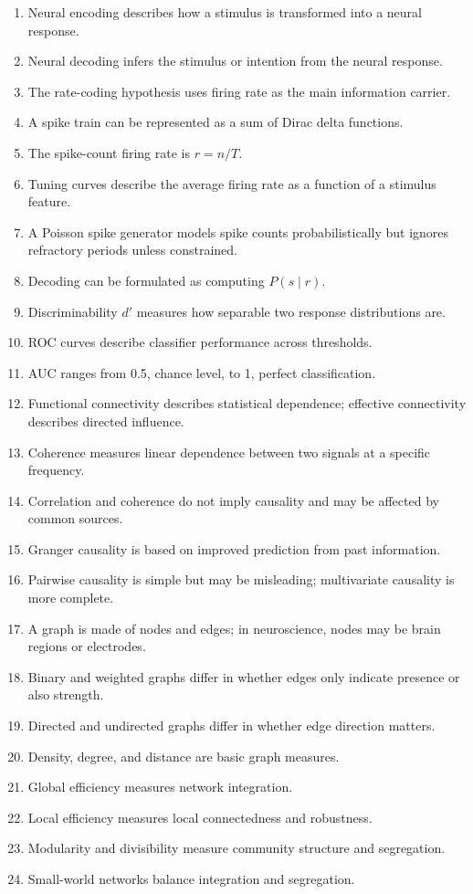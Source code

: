 \begin{enumerate}
    \item Neural encoding describes how a stimulus is transformed into a neural response.
    \item Neural decoding infers the stimulus or intention from the neural response.
    \item The rate-coding hypothesis uses firing rate as the main information carrier.
    \item A spike train can be represented as a sum of Dirac delta functions.
    \item The spike-count firing rate is $r=n/T$.
    \item Tuning curves describe the average firing rate as a function of a stimulus feature.
    \item A Poisson spike generator models spike counts probabilistically but ignores refractory periods unless constrained.
    \item Decoding can be formulated as computing $P(s \mid r)$.
    \item Discriminability $d'$ measures how separable two response distributions are.
    \item ROC curves describe classifier performance across thresholds.
    \item AUC ranges from 0.5, chance level, to 1, perfect classification.
    \item Functional connectivity describes statistical dependence; effective connectivity describes directed influence.
    \item Coherence measures linear dependence between two signals at a specific frequency.
    \item Correlation and coherence do not imply causality and may be affected by common sources.
    \item Granger causality is based on improved prediction from past information.
    \item Pairwise causality is simple but may be misleading; multivariate causality is more complete.
    \item A graph is made of nodes and edges; in neuroscience, nodes may be brain regions or electrodes.
    \item Binary and weighted graphs differ in whether edges only indicate presence or also strength.
    \item Directed and undirected graphs differ in whether edge direction matters.
    \item Density, degree, and distance are basic graph measures.
    \item Global efficiency measures network integration.
    \item Local efficiency measures local connectedness and robustness.
    \item Modularity and divisibility measure community structure and segregation.
    \item Small-world networks balance integration and segregation.
\end{enumerate}

